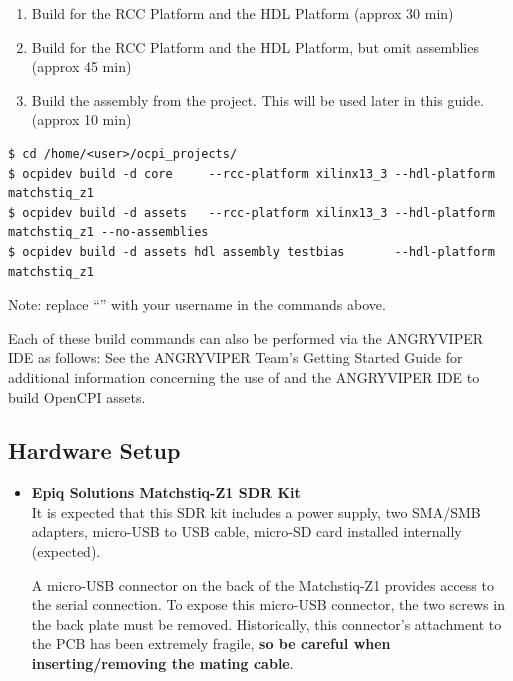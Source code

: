 \begin{flushleft}
\begin{enumerate}
	\item Build  for the  RCC Platform and the  HDL Platform (approx 30 min)
	\item Build  for the  RCC Platform and the  HDL Platform, but omit assemblies (approx 45 min)
	\item Build the  assembly from the  project. This will be used later in this guide. (approx 10 min)
\end{enumerate}
\begin{lstlisting}[showspaces=false]
$ cd /home/<user>/ocpi_projects/
$ ocpidev build -d core     --rcc-platform xilinx13_3 --hdl-platform matchstiq_z1
$ ocpidev build -d assets   --rcc-platform xilinx13_3 --hdl-platform matchstiq_z1 --no-assemblies
$ ocpidev build -d assets hdl assembly testbias       --hdl-platform matchstiq_z1
\end{lstlisting}
Note: replace ``'' with your username in the commands above.\\\medskip

Each of these build commands can also be performed via the ANGRYVIPER IDE as follows:
\OcpidevBuild
See the ANGRYVIPER Team's Getting Started Guide for additional information concerning the use of  and the ANGRYVIPER IDE to build OpenCPI assets.

\subsection{Hardware Setup}
\begin{itemize}

\item \textbf{Epiq Solutions Matchstiq-Z1 SDR Kit}\\ \medskip
It is expected that this SDR kit includes a power supply, two SMA/SMB adapters, micro-USB to USB cable, micro-SD card installed internally (expected).

A micro-USB connector on the back of the Matchstiq-Z1 provides access to the serial connection. To expose this micro-USB connector, the two screws in the back plate must be removed.  Historically, this connector's attachment to the PCB has been extremely fragile, \textbf{so be careful when inserting/removing the mating cable}.\\ \medskip


\end{itemize}
\end{flushleft}
